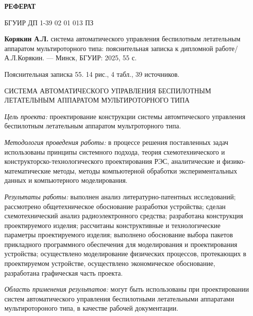 \thispagestyle{empty} %

\begin{center}  
\textbf{РЕФЕРАТ}
\end{center}

БГУИР ДП 1-39 02 01 013 ПЗ

\textbf{Корякин А.Л.} система автоматического управления
беспилотным летательным аппаратом мультироторного типа:
пояснительная записка к дипломной работе/А.Л.Корякин.
— Минск, БГУИР: 2025, 55 с.

Пояснительная записка 55. 14 рис., 4 табл., 39 источников.

СИСТЕМА АВТОМАТИЧЕСКОГО УПРАВЛЕНИЯ БЕСПИЛОТНЫМ ЛЕТАТЕЛЬНЫМ АППАРАТОМ
МУЛЬТИРОТОРНОГО ТИПА

\textit{Цель проекта:} проектирование конструкции
системы автомтического управления беспилотным летательным аппаратом
мультроторного типа.

\textit{Методология проведения работы:}
в процессе решения поставленных задач использованы принципы системного
подхода, теория схемотехнического и конструкторско-технологического
проектирования РЭС, аналитические и физико-математические методы,
методы компьютерной обработки экспериментальных данных и компьютерного
моделирования.

\textit{Результаты работы:}
выполнен анализ литературно-патентных исследований; рассмотрено
общетехническое обоснование разработки устройства; сделан
схемотехнический анализ радиоэлектронного средства; разработана
конструкция проектируемого изделия; рассчитаны конструктивные и
технологические параметры проектируемого изделия; выполнено
обоснование выбора пакетов прикладного программного обеспечения для
моделирования и проектирования устройства; осуществлено моделирование
физических процессов, протекающих в проектируемом устройстве,
осуществлено экономическое обоснование, разработана графическая часть
проекта.

\textit{Область применения результатов:} могут быть использованы при
проектировании систем автоматического управления беспилотными
летательными аппаратами мультиротороного типа, в качестве рабочей
документации.

\newpage
